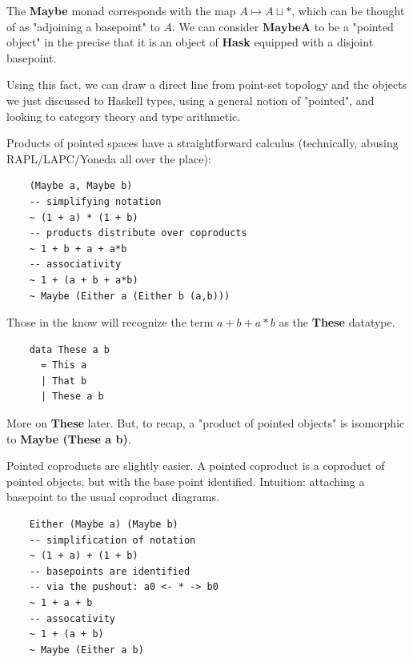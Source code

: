 \documentclass[tikz]{beamer}
\theoremstyle{definition}
\begin{document}
\frame
{
	The \textbf{Maybe} monad corresponds with the map $A \mapsto  A \sqcup *$, which can be thought of as "adjoining a basepoint" to $A$. We can consider $\mathbf{Maybe A}$ to be a "pointed object" in the precise that it is an object of \textbf{Hask} equipped with a disjoint basepoint. 
}

\frame
{
 	Using this fact, we can draw a direct line from point-set topology and the objects we just discussed to Haskell types, using a general notion of "pointed", and looking to category theory and type arithmetic. 
}


\begin{frame}[fragile]
	Products of pointed spaces have a straightforward calculus (technically, abusing RAPL/LAPC/Yoneda all over the place):  
	
	\begin{verbatim}
	(Maybe a, Maybe b)
	-- simplifying notation
	~ (1 + a) * (1 + b)
	-- products distribute over coproducts
	~ 1 + b + a + a*b
	-- associativity
	~ 1 + (a + b + a*b)
	~ Maybe (Either a (Either b (a,b)))
	\end{verbatim}
\end{frame}

\frame
{
	Those in the know will recognize the term $a + b + a*b$ as the \textbf{These} datatype.
}

\begin{frame}[fragile]
\begin{center}
	\begin{verbatim}
	data These a b 
	  = This a
	  | That b
	  | These a b
	\end{verbatim}
\end{center}
\end{frame}

\frame
{
	More on \textbf{These} later. But, to recap, a "product of pointed objects" is isomorphic to \textbf{Maybe (These a b)}.
}

\frame
{
	Pointed coproducts are slightly easier. A pointed coproduct is a coproduct of pointed objects, but with the base point identified. Intuition: attaching a basepoint to the usual coproduct diagrams.
}

\begin{frame}[fragile]
\begin{center}
	\begin{verbatim}
	Either (Maybe a) (Maybe b)
	-- simplification of notation
	~ (1 + a) + (1 + b)
	-- basepoints are identified 
	-- via the pushout: a0 <- * -> b0
	~ 1 + a + b
	-- assocativity
	~ 1 + (a + b)
	~ Maybe (Either a b)
	\end{verbatim}
\end{center}
\end{frame}
\end{document}
